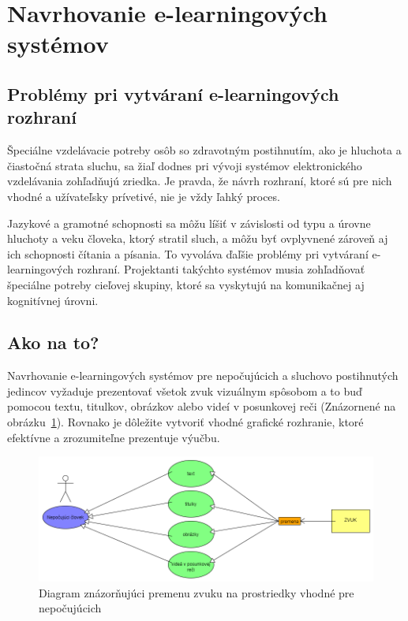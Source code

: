 \documentclass[10pt,oneside,slovak,a4paper]{article}
\begin{document}
\section{Navrhovanie e-learningových systémov} \label{navrhovanie}

\subsection{Problémy pri vytváraní e-learningových rozhraní} \label{navrhovanie:problemy}
Špeciálne vzdelávacie potreby osôb so zdravotným postihnutím, ako je hluchota a čiastočná strata sluchu, sa žiaľ dodnes pri vývoji systémov elektronického vzdelávania zohľadňujú zriedka. Je pravda, že návrh rozhraní, ktoré sú pre nich vhodné a užívateľsky prívetivé, nie je vždy ľahký proces.

Jazykové a gramotné schopnosti sa môžu líšiť v závislosti od typu a úrovne hluchoty a veku človeka, ktorý stratil sluch, a môžu byť ovplyvnené zároveň aj ich schopnosti čítania a písania. To vyvoláva ďaľšie problémy pri vytváraní e-learningových rozhraní. Projektanti takýchto systémov musia zohľadňovať špeciálne potreby cieľovej skupiny, ktoré sa vyskytujú na komunikačnej aj kognitívnej úrovni.\cite{pappas2018learning}

\subsection{Ako na to?}\label{navrhovanie:ako}
Navrhovanie e-learningových systémov pre nepočujúcich a sluchovo postihnutých jedincov vyžaduje prezentovať všetok zvuk vizuálnym spôsobom a to buď pomocou textu, titulkov, obrázkov alebo videí v posunkovej reči (Znázornené na obrázku~\ref{diagram}). Rovnako je dôležite vytvoriť vhodné grafické rozhranie, ktoré efektívne a zrozumiteľne prezentuje výučbu.
\begin{figure}[H]
   \includegraphics[scale=0.4]{diagram.png}
\centering
\caption{Diagram znázorňujúci premenu zvuku na prostriedky vhodné pre nepočujúcich}

\label{diagram}
\end{figure}
\end{document}
